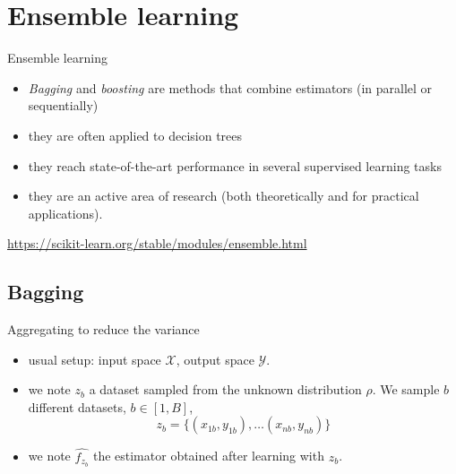 \documentclass[usenames,dvipsnames]{beamer}
\begin{document}
\section{Ensemble learning}%
\label{sec:ensemble_learning}

\begin{frame}{Ensemble learning}
    \begin{itemize}
	\item \textit{{Bagging}}  and \textit{{boosting}} are methods that combine estimators (in parallel or sequentially)
	\item they are often applied to decision trees
	\item they reach state-of-the-art performance in several supervised learning tasks \cite{Fernandez-Delgado2014} 
	\item they are an active area of research (both theoretically and for practical applications).
    \end{itemize}

    \url{https://scikit-learn.org/stable/modules/ensemble.html} 
\end{frame}

\subsection{Bagging}%
\label{sub:bagging}


\begin{frame}{Aggregating to reduce the variance}
    \begin{itemize}
        \item usual setup: input space $ \mathcal{X} $, output space $ \mathcal{Y} $.
	\item we note $z_b$ a dataset sampled from the unknown distribution $ \rho$. We sample $b$ different datasets, $b\in [1, B]$, 
	    \begin{equation}
		z_b = \{(x_{1b}, y_{1b}), \dots (x_{nb}, y_{nb})\}
	    \end{equation}
	\item we note $ \hat{f_{z_b}}$ the estimator obtained after learning with $ z_b$.
    \end{itemize}
\end{frame}
\end{document}

